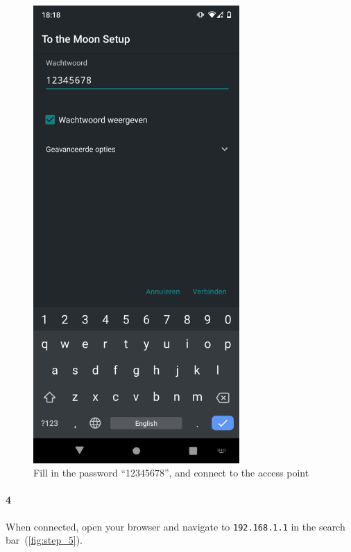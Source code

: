 \documentclass[11pt]{article}
\begin{document}
\begin{figure}[H]
        \begin{minipage}{0.45\textwidth}
            \centering
            \includegraphics[width=0.7\textwidth]{step_3}
            \caption{Fill in the password ``12345678'', and connect to the access point}
            \label{fig:step_3}
        \end{minipage}
    \end{figure}
    \newpage
    \paragraph{4} When connected, open your browser and navigate to \verb!192.168.1.1! in the search bar~(\textcolor{blue}{\cref{fig:step_5}}).
\end{document}
